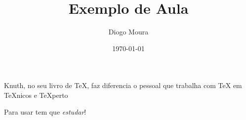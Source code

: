 \documentclass{article}
\title{Exemplo de Aula}
\author{Diogo Moura}
\date{\today}
\begin{document}
\maketitle
Knuth, no seu livro de \TeX{},
faz diferencia o pessoal
que trabalha com \TeX{} em
\TeX{}nicos e \TeX perto

Para usar tem que \textsl{estudar}!
\end{document}
